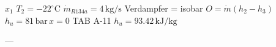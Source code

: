 \( x_1 \)  
\( T_2 = -22^\circ \text{C} \)  
\( \dot{m}_{R134a} = 4 \, \text{kg/s} \)  
Verdampfer = isobar  
\( O = \dot{m} (h_2 - h_3) \)  
\( h_u = 81 \, \text{bar} \, x = 0 \)  
TAB A-11 \( h_u = 93.42 \, \text{kJ/kg} \)  

---